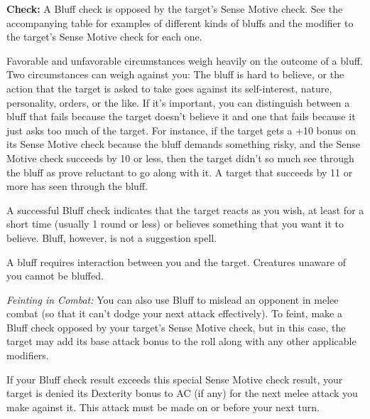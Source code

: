 \textbf{Check:} A Bluff check is opposed by the target's Sense Motive check. See the accompanying table for examples of different kinds of bluffs and the modifier to the target's Sense Motive check for each one.

Favorable and unfavorable circumstances weigh heavily on the outcome of a bluff. Two circumstances can weigh against you: The bluff is hard to believe, or the action that the target is asked to take goes against its self-interest, nature, personality, orders, or the like. If it's important, you can distinguish between a bluff that fails because the target doesn't believe it and one that fails because it just asks too much of the target. For instance, if the target gets a +10 bonus on its Sense Motive check because the bluff demands something risky, and the Sense Motive check succeeds by 10 or less, then the target didn't so much see through the bluff as prove reluctant to go along with it. A target that succeeds by 11 or more has seen through the bluff.

A successful Bluff check indicates that the target reacts as you wish, at least for a short time (usually 1 round or less) or believes something that you want it to believe. Bluff, however, is not a suggestion spell.

A bluff requires interaction between you and the target. Creatures unaware of you cannot be bluffed.


\textit{Feinting in Combat:} You can also use Bluff to mislead an opponent in melee combat (so that it can't dodge your next attack effectively). To feint, make a Bluff check opposed by your target's Sense Motive check, but in this case, the target may add its base attack bonus to the roll along with any other applicable modifiers.

If your Bluff check result exceeds this special Sense Motive check result, your target is denied its Dexterity bonus to AC (if any) for the next melee attack you make against it. This attack must be made on or before your next turn.

